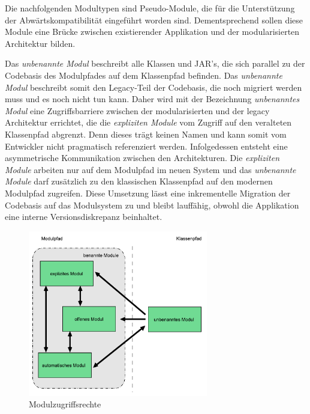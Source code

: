    Die nachfolgenden Modultypen sind Pseudo-Module, die für die Unterstützung der Abwärtskompatibilität eingeführt worden sind. 
    Dementsprechend sollen diese Module eine Brücke zwischen existierender Applikation und der modularisierten Architektur bilden.\bigbreak

    Das \textit{unbenannte Modul} beschreibt alle Klassen und JAR's, die sich parallel zu der Codebasis des Modulpfades auf dem Klassenpfad befinden. Das \textit{unbenannte Modul} beschreibt somit den Legacy-Teil der Codebasis, die noch migriert werden muss und es noch nicht tun kann. Daher wird mit der Bezeichnung \textit{unbenanntes Modul} eine Zugriffsbarriere zwischen der modularisierten und der legacy Architektur errichtet, die die \textit{expliziten Module} vom Zugriff auf den veralteten Klassenpfad abgrenzt. Denn dieses trägt keinen Namen und kann somit vom Entwickler nicht pragmatisch referenziert werden.\newline
    Infolgedessen entsteht eine asymmetrische Kommunikation zwischen den Architekturen. Die \textit{expliziten Module} arbeiten nur auf dem Modulpfad im neuen System und das \textit{unbenannte Module} darf zusätzlich zu den klassischen Klassenpfad auf den modernen Modulpfad zugreifen. Diese Umsetzung lässt eine inkrementelle Migration der Codebasis auf das Modulsystem zu und bleibt lauffähig, obwohl die Applikation eine interne Versionsdiskrepanz beinhaltet. \cite{modulMitJava9,java9modRevealed,modulProgJava9}

    \begin{figure}[h]
      \centering
      \includegraphics[width=0.7\textwidth]{material/images/module-access.pdf}
      \caption{Modulzugriffsrechte \cite{modulMitJava9}}
      \label{fig:modacc}
    \end{figure}

